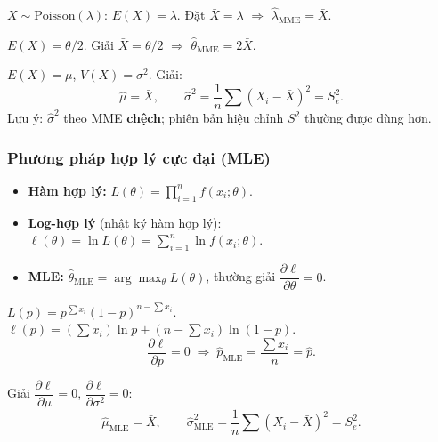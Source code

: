 \documentclass[12pt,a4paper]{article}
\begin{document}
\begin{vidu}[title={MME cho phân phối Poisson}]
$X \sim \text{Poisson}(\lambda)$: $E(X) = \lambda$. Đặt $\bar{X} = \lambda$ $\Rightarrow$ $\hat{\lambda}_{\text{MME}} = \bar{X}$.
\end{vidu}

\begin{vidu}[title={MME cho phân phối Uniform$(0,\theta)$}]
$E(X) = \theta/2$. Giải $\bar{X} = \theta/2$ $\Rightarrow$ $\hat{\theta}_{\text{MME}} = 2\bar{X}$.
\end{vidu}

\begin{vidu}[title={MME cho phân phối chuẩn}]
$E(X) = \mu$, $V(X) = \sigma^2$. Giải:
\[
  \hat{\mu} = \bar{X}, \qquad \hat{\sigma}^2 = \dfrac{1}{n}\displaystyle\sum(X_i-\bar{X})^2 = S_e^2.
\]
Lưu ý: $\hat{\sigma}^2$ theo MME \textbf{chệch}; phiên bản hiệu chỉnh $S^2$ thường được dùng hơn.
\end{vidu}

\subsubsection{Phương pháp hợp lý cực đại (MLE)}

\begin{phuongphap}[title={MLE}]
\begin{itemize}
  \item \textbf{Hàm hợp lý:} $L(\theta) = \prod_{i=1}^n f(x_i;\theta)$.
  \item \textbf{Log-hợp lý} (nhật ký hàm hợp lý): $\ell(\theta) = \ln L(\theta) = \displaystyle\sum_{i=1}^n \ln f(x_i;\theta)$.
  \item \textbf{MLE:} $\hat{\theta}_{\text{MLE}} = \arg\max_\theta L(\theta)$, thường giải $\dfrac{\partial \ell}{\partial \theta} = 0$.
\end{itemize}
\end{phuongphap}

\begin{vidu}[title={MLE cho Bernoulli$(p)$}]
$L(p) = p^{\displaystyle\sum x_i}(1-p)^{n-\displaystyle\sum x_i}$. $\ell(p) = (\displaystyle\sum x_i)\ln p + (n-\displaystyle\sum x_i)\ln(1-p)$.
\[
  \dfrac{\partial \ell}{\partial p} = 0 \;\Rightarrow\; \hat{p}_{\text{MLE}} = \dfrac{\displaystyle\sum x_i}{n} = \hat{p}.
\]
\end{vidu}

\begin{vidu}[title={MLE cho $\mathcal{N}(\mu,\sigma^2)$}]
Giải $\dfrac{\partial\ell}{\partial\mu} = 0$, $\dfrac{\partial\ell}{\partial\sigma^2} = 0$:
\[
  \hat{\mu}_{\text{MLE}} = \bar{X}, \qquad \hat{\sigma}^2_{\text{MLE}} = \dfrac{1}{n}\displaystyle\sum(X_i-\bar{X})^2 = S_e^2.
\]
\end{vidu}
\end{document}
